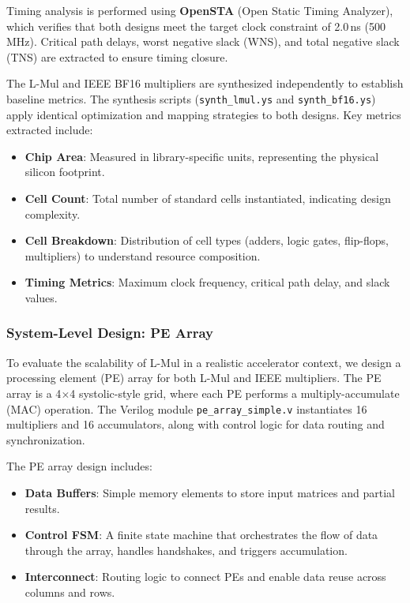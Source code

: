 \documentclass[12pt,letterpaper]{article}
\begin{document}
Timing analysis is performed using \textbf{OpenSTA} (Open Static Timing Analyzer), which verifies that both designs meet the target clock constraint of 2.0\,ns (500\,MHz). Critical path delays, worst negative slack (WNS), and total negative slack (TNS) are extracted to ensure timing closure.

The L-Mul and IEEE BF16 multipliers are synthesized independently to establish baseline metrics. The synthesis scripts (\texttt{synth\_lmul.ys} and \texttt{synth\_bf16.ys}) apply identical optimization and mapping strategies to both designs. Key metrics extracted include:
\begin{itemize}
    \item \textbf{Chip Area}: Measured in library-specific units, representing the physical silicon footprint.
    \item \textbf{Cell Count}: Total number of standard cells instantiated, indicating design complexity.
    \item \textbf{Cell Breakdown}: Distribution of cell types (adders, logic gates, flip-flops, multipliers) to understand resource composition.
    \item \textbf{Timing Metrics}: Maximum clock frequency, critical path delay, and slack values.
\end{itemize}

\subsubsection{System-Level Design: PE Array}
To evaluate the scalability of L-Mul in a realistic accelerator context, we design a processing element (PE) array for both L-Mul and IEEE multipliers. The PE array is a 4$\times$4 systolic-style grid, where each PE performs a multiply-accumulate (MAC) operation. The Verilog module \texttt{pe\_array\_simple.v} instantiates 16 multipliers and 16 accumulators, along with control logic for data routing and synchronization.

The PE array design includes:
\begin{itemize}
    \item \textbf{Data Buffers}: Simple memory elements to store input matrices and partial results.
    \item \textbf{Control FSM}: A finite state machine that orchestrates the flow of data through the array, handles handshakes, and triggers accumulation.
    \item \textbf{Interconnect}: Routing logic to connect PEs and enable data reuse across columns and rows.
\end{itemize}
\end{document}
